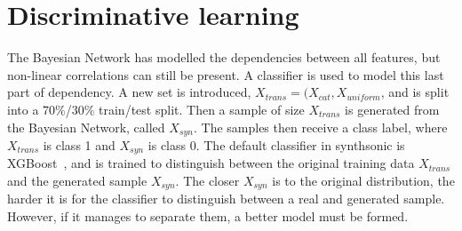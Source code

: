 \section{Discriminative learning}
The Bayesian Network has modelled the dependencies between all features, but non-linear correlations can still be present. A classifier is used to model this last part of dependency. A new set is introduced, $X_{trans} = (X_{cat},X_{uniform}$, and is split into a 70\%/30\% train/test split. Then a sample of size $X_{trans}$ is generated from the Bayesian Network, called $X_{syn}$. The samples then receive a class label, where $X_{trans}$ is class 1 and $X_{syn}$ is class 0. The default classifier in synthsonic is XGBoost~\cite{Chen2016XGBoost:System}, and is trained to distinguish between the original training data $X_{trans}$ and the generated sample $X_{syn}$. The closer $X_{syn}$ is to the original distribution, the harder it is for the classifier to distinguish between a real and generated sample. However, if it manages to separate them, a better model must be formed. 


